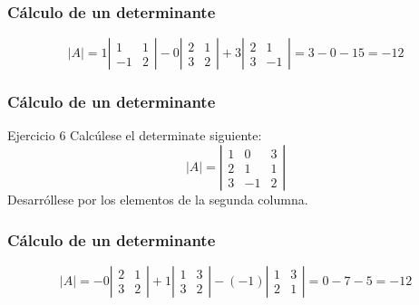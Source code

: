 \documentclass[12pt]{article}
\begin{document}
\begin{frame}
  \frametitle{C\'alculo de un determinante}
\[|A| = 1\left|\begin{array}{cc} 1 & 1 \\ -1 & 2\end{array}\right|
-0\left|\begin{array}{cc} 2 & 1 \\ 3 & 2\end{array}\right|
+3\left|\begin{array}{cc} 2 & 1 \\ 3 & -1\end{array}\right| = 3-0-15 = -12\]
\end{frame}   


\begin{frame}
  \frametitle{C\'alculo de un determinante}
     \begin{block}{Ejercicio 6}
Calc\'ulese el determinate siguiente:
\[|A| = \left|\begin{array}{ccc}1 & 0 & 3 \\2 & 1 & 1 \\3 & -1 & 2\end{array}\right|\]
Desarr\'ollese por los elementos de la segunda columna.
\end{block}
\end{frame} 

\begin{frame}
  \frametitle{C\'alculo de un determinante}
\[|A| = -0\left|\begin{array}{cc} 2 & 1 \\ 3 & 2\end{array}\right|
+1\left|\begin{array}{cc} 1 & 3 \\ 3 & 2\end{array}\right|
-(-1)\left|\begin{array}{cc} 1 & 3 \\ 2 & 1\end{array}\right| = 0-7-5 = -12\]
\end{frame}   
\end{document}
